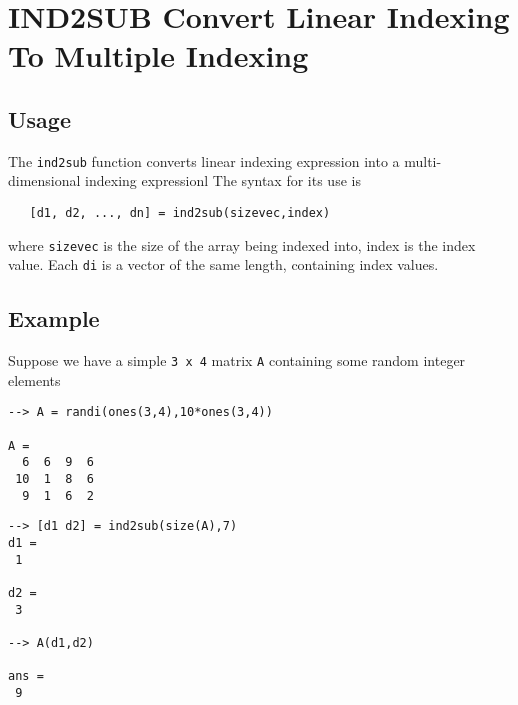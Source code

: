 \section{IND2SUB Convert Linear Indexing To Multiple Indexing}

\subsection{Usage}

The \verb|ind2sub| function converts linear indexing expression into a multi-dimensional indexing expressionl
 The syntax for its use
is
\begin{verbatim}
   [d1, d2, ..., dn] = ind2sub(sizevec,index)
\end{verbatim}
where \verb|sizevec| is the size of the array being indexed into, index is the index value. Each
\verb|di| is a vector of the same length, containing index values.  
\subsection{Example}

Suppose we have a simple \verb|3 x 4| matrix \verb|A| containing some random integer
elements
\begin{verbatim}
--> A = randi(ones(3,4),10*ones(3,4))

A = 
  6  6  9  6 
 10  1  8  6 
  9  1  6  2 
\end{verbatim}
\begin{verbatim}
--> [d1 d2] = ind2sub(size(A),7)
d1 = 
 1 

d2 = 
 3 

--> A(d1,d2)

ans = 
 9 
\end{verbatim}
